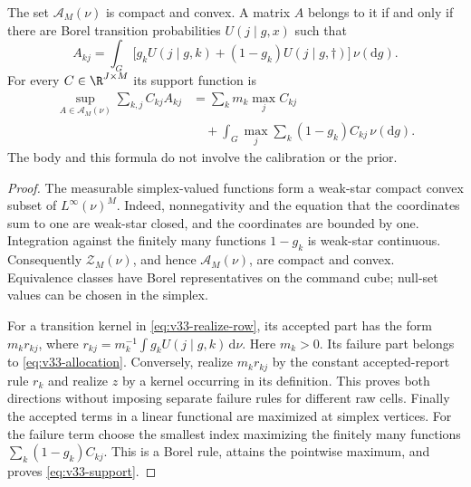 \begin{lemma}\label{lem:v33-body}
The set $\mathscr A_M(\nu)$ is compact and convex. A matrix $A$ belongs
to it if and only if there are Borel transition probabilities
$U(j\mid g,x)$ such that
\begin{equation}\label{eq:v33-realize-row}
 A_{kj}=\int_G\bigl[g_k U(j\mid g,k)
                 +(1-g_k)U(j\mid g,\dagger)\bigr]\,\nu(\mathrm dg).
\end{equation}
For every $C\in\R^{J\times M}$ its support function is
\begin{equation}\label{eq:v33-support}
 \begin{split}
 \sup_{A\in\mathscr A_M(\nu)}\sum_{k,j}C_{kj}A_{kj}
 &=\sum_k m_k\max_j C_{kj}\\
 &\quad+\int_G\max_j\sum_k(1-g_k)C_{kj}\,\nu(\mathrm dg).
 \end{split}
\end{equation}
The body and this formula do not involve the calibration or the prior.
\end{lemma}
\begin{proof}
The measurable simplex-valued functions form a weak-star compact convex
subset of $L^\infty(\nu)^M$. Indeed, nonnegativity and the equation that
the coordinates sum to one are weak-star closed, and the coordinates
are bounded by one. Integration against the finitely many functions
$1-g_k$ is weak-star continuous. Consequently $\mathscr Z_M(\nu)$,
and hence $\mathscr A_M(\nu)$, are compact and convex. Equivalence
classes have Borel representatives on the command cube; null-set
values can be chosen in the simplex.

For a transition kernel in \eqref{eq:v33-realize-row}, its accepted
part has the form $m_k r_{kj}$, where
$r_{kj}=m_k^{-1}\int g_k U(j\mid g,k)\,\mathrm d\nu$. Here $m_k>0$.
Its failure part belongs to \eqref{eq:v33-allocation}. Conversely,
realize $m_k r_{kj}$ by the constant accepted-report rule $r_k$ and
realize $z$ by a kernel occurring in its definition. This proves both
directions without imposing separate failure rules for different raw
cells. Finally the accepted terms in a linear functional are maximized
at simplex vertices. For the failure term choose the smallest index
maximizing the finitely many functions
$\sum_k(1-g_k)C_{kj}$. This is a Borel rule, attains the pointwise
maximum, and proves \eqref{eq:v33-support}.
\end{proof}

